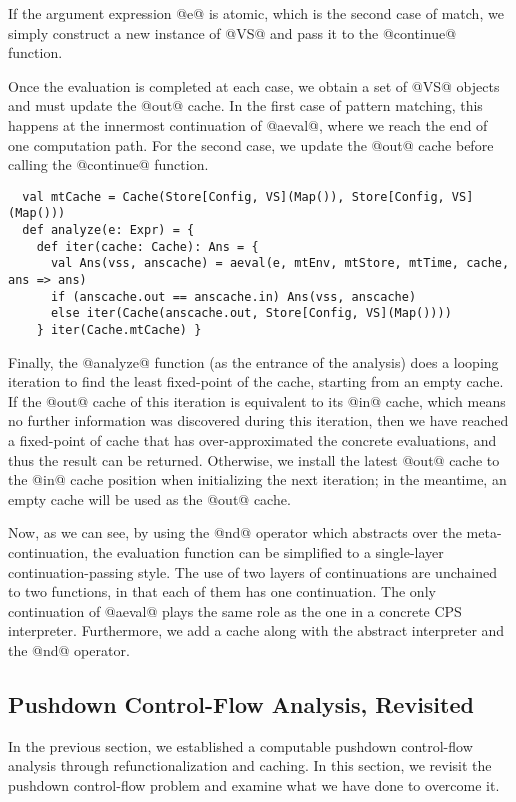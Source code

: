 \documentclass[acmsmall, screen]{acmart}\settopmatter{}
\begin{document}
If the argument expression @e@ is atomic, which is the second case of match, we simply
construct a new instance of @VS@ and pass it to the @continue@ function.

Once the evaluation is completed at each case, we obtain a set of @VS@ objects and must
update the @out@ cache. In the first case of pattern matching, this happens at the
innermost continuation of @aeval@, where we reach the end of one computation path.
For the second case, we update the @out@ cache before calling the @continue@ function.

\begin{lstlisting}
  val mtCache = Cache(Store[Config, VS](Map()), Store[Config, VS](Map()))
  def analyze(e: Expr) = {
    def iter(cache: Cache): Ans = {
      val Ans(vss, anscache) = aeval(e, mtEnv, mtStore, mtTime, cache, ans => ans)
      if (anscache.out == anscache.in) Ans(vss, anscache)
      else iter(Cache(anscache.out, Store[Config, VS](Map())))
    } iter(Cache.mtCache) }
\end{lstlisting}

Finally, the @analyze@ function (as the entrance of the analysis) does a looping iteration
to find the least fixed-point of the cache, starting from an empty cache.
If the @out@ cache of this iteration is equivalent to its @in@ cache, which means no further
information was discovered during this iteration, then we have reached a fixed-point of cache that
has over-approximated the concrete evaluations, and thus the result can be returned.
Otherwise, we install the latest @out@ cache to the @in@ cache position when initializing
the next iteration; in the meantime, an empty cache will be used as the @out@ cache.

Now, as we can see, by using the @nd@ operator which abstracts over the meta-continuation,
the evaluation function can be simplified to a single-layer continuation-passing style.
The use of two layers of continuations are unchained to two functions,
in that each of them has one continuation.
The only continuation of @aeval@ plays the same role as the one in a
concrete CPS interpreter.
Furthermore, we add a cache along with the abstract interpreter and the @nd@ operator.

\subsection{Pushdown Control-Flow Analysis, Revisited} \label{pdcfarevisit}

In the previous section, we established a computable pushdown control-flow
analysis through refunctionalization and caching. In this section, we revisit
the pushdown control-flow problem and examine what we have done to overcome it. \\
\end{document}

